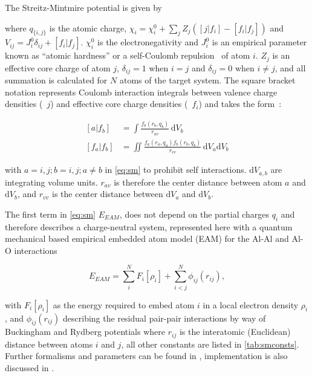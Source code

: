 The Streitz-Mintmire potential is given by

where $q_{\{i,j\}}$ is the atomic charge, $\chi_i = \chi_i^0 + \sum_{j}Z_{j}(\left[j|f_i\right]-\left[f_i|f_j\right])$ and $V_{ij} = J_{i}^{0}\delta_{ij}+\left[f_i|f_j\right]$.
$\chi_i^0$ is the electronegativity and $J_i^0$ is an empirical parameter known as ``atomic hardness'' or a self-Coulomb repulsion~\cite{Rappe1991} of atom $i$.
$Z_j$ is an effective core charge of atom $j$, $\delta_{ij} = 1$ when $i=j$ and $\delta_{ij} = 0$ when $i\neq j$, and all summation is calculated for $N$ atoms of the target system.
The square bracket notation represents Coulomb interaction integrals between valence charge densities (\eg\ $j$) and effective core charge densities (\eg\ $f_i$) and takes the form~\cite{Zhou2004}:

\begin{align}
\left[a|f_b\right] &= \int \frac{f_b(r_b,q_b)}{r_{av}}\,\mathrm{d}V_b\\
\left[f_a|f_b\right] &= \iint \frac{f_a(r_a,q_a)f_b(r_b,q_b)}{r_{vv}}\,\mathrm{d}V_a \mathrm{d}V_b
\end{align}

with $a=i,j; b=i,j; a\neq b$ in \cref{eq:sm} to prohibit self interactions.
$\mathrm{d}V_{a,b}$ are integrating volume units.
$r_{av}$ is therefore the center distance between atom $a$ and $\mathrm{d}V_b$, and $r_{vv}$ is the center distance between $\mathrm{d}V_a$ and $\mathrm{d}V_b$.

The first term in \cref{eq:sm} $E_{EAM}$, does not depend on the partial charges $q_i$ and therefore describes a charge-neutral system, represented here with a quantum mechanical based empirical embedded atom model (EAM) for the Al-Al and Al-O interactions

\begin{equation}
E_{EAM} = \sum_{i}^{N}F_{i}\left[\rho_i\right]+\sum_{i<j}^{N}\phi_{ij}(r_{ij}),
\end{equation}

with $F_{i}\left[\rho_i\right]$ as the energy required to embed atom $i$ in a local electron density $\rho_i$, and $\phi_{ij}(r_{ij})$ describing the residual pair-pair interactions by way of Buckingham and Rydberg potentials
where $r_{ij}$ is the interatomic (Euclidean) distance between atoms $i$ and $j$, all other constants are listed in \cref{tab:smconsts}.
Further formalisms and parameters can be found in \cite{Streitz1994,Zhou2004}, implementation is also discussed in \cite{Gale2003}.


